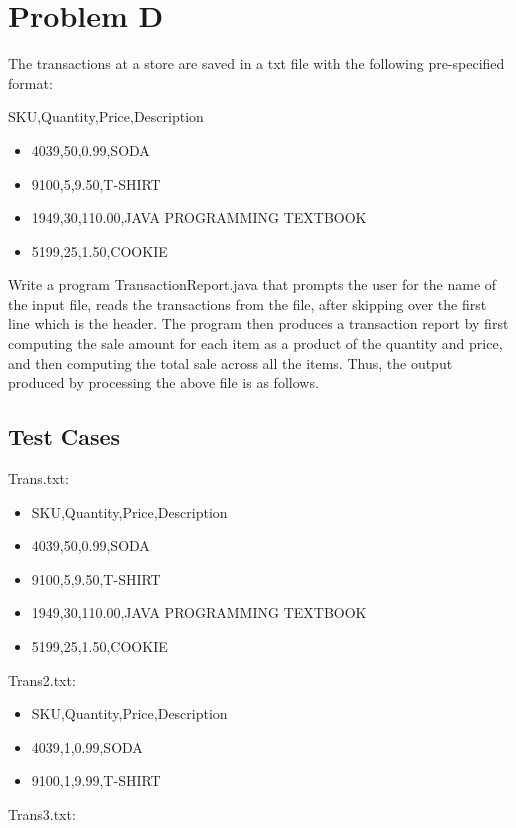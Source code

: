 \documentclass{article}
\begin{document}
\section*{Problem D}

The transactions at a store are saved in a txt file with the following pre-specified format:

\noindent
SKU,Quantity,Price,Description 
\begin{itemize}
    \item 4039,50,0.99,SODA
    \item 9100,5,9.50,T-SHIRT
    \item 1949,30,110.00,JAVA PROGRAMMING TEXTBOOK
    \item 5199,25,1.50,COOKIE
\end{itemize}
Write a program TransactionReport.java that prompts the user for the name of the input file, reads the transactions from the file, after skipping over the first line which is the header. The program then produces a transaction report by first computing the sale amount for each item as a product of the quantity and price, and then computing the total sale across all the items. Thus, the output produced by processing the above file is as follows.

\subsection*{Test Cases}
Trans.txt:

\begin{itemize}
    \item SKU,Quantity,Price,Description 
    \item 4039,50,0.99,SODA
    \item 9100,5,9.50,T-SHIRT
    \item 1949,30,110.00,JAVA PROGRAMMING TEXTBOOK 
    \item 5199,25,1.50,COOKIE
\end{itemize}

\noindent
Trans2.txt:

\begin{itemize}
    \item SKU,Quantity,Price,Description 
    \item 4039,1,0.99,SODA
    \item 9100,1,9.99,T-SHIRT
\end{itemize}

\noindent
Trans3.txt:
\end{document}
